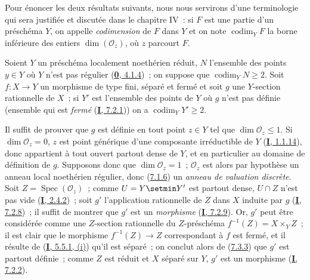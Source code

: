 \begin{env}[7.3.4]
\label{II.7.3.4-fr}
Pour énoncer les deux résultats suivants, nous nous servirons d'une
terminologie qui sera justifiée et discutée dans le chapitre IV~: si $F$ est
une partie
d'un préschéma $Y$, on appelle \emph{codimension} de $F$ dans $Y$ et on note
$\operatorname{codim}_YF$ la borne inférieure des entiers
$\dim(\mathcal{O}_z)$, où $z$ parcourt $F$.
\end{env}

\begin{corollary}[7.3.5]
\label{II.7.3.5-fr}
Soient $Y$ un préschéma localement noethérien réduit, $N$ l'ensemble des
points $y\in Y$ où $Y$ n'est pas régulier
\textup{(\hyperref[0.4.1.4-fr]{\textbf{0}, 4.1.4})}~; on suppose que
$\operatorname{codim}_YN\geq2$. Soit $f:X\to Y$ un morphisme de type fini,
\textup{séparé} et \textup{fermé} et soit $g$ une $Y$-section rationnelle de $X$~; si $Y'$ est
l'ensemble des points de $Y$ où $g$ n'est pas définie \textup{(ensemble qui est
\emph{fermé} (\hyperref[I.7.2.1-fr]{\textbf{I}, 7.2.1}))} on a
$\operatorname{codim}_YY'\geq2$.
\end{corollary}

Il suffit de prouver que $g$ est définie en tout point $z\in Y$ tel que
$\dim\mathcal{O}_z\leq1$. Si $\dim\mathcal{O}_z=0$, $z$ est point générique
d'une composante irréductible de $Y$ (\hyperref[I.1.1.14-fr]{\textbf{I}, 1.1.14}), donc
appartient à tout ouvert partout dense de $Y$, et en particulier au domaine de
définition de $g$. Supposons donc que $\dim\mathcal{O}_z=1$~;
$\mathcal{O}_z$ est alors par hypothèse un anneau local noethérien régulier,
donc (\hyperref[II.7.1.6-fr]{7.1.6}) un \emph{anneau de valuation discrète}.
Soit $Z=\operatorname{Spec}(\mathcal{O}_z)$~; comme $U=Y\setmin Y'$ est partout
dense, $U\cap Z$ n'est pas vide (\hyperref[I.2.4.2-fr]{\textbf{I}, 2.4.2})~; soit $g'$
l'application rationnelle de $Z$ dans $X$ induite par $g$
(\hyperref[I.7.2.8-fr]{\textbf{I}, 7.2.8})~; il suffit de montrer que $g'$ est un
\emph{morphisme} (\hyperref[I.7.2.9-fr]{\textbf{I}, 7.2.9}). Or, $g'$ peut être
considérée comme une $Z$-section rationnelle du $Z$-préschéma
$f^{-1}(Z)=X\times_YZ$~; il est clair que le morphisme $f^{-1}(Z)\to Z$
correspondant à $f$ est fermé, et il résulte de
(\hyperref[I.5.5.1-fr]{\textbf{I}, 5.5.1, (i)}) qu'il est séparé~; on conclut alors de
(\hyperref[II.7.3.3-fr]{7.3.3}) que $g'$ est partout définie~; comme $Z$ est
réduit et $X$ séparé sur $Y$, $g'$ est un morphisme
(\hyperref[I.7.2.2-fr]{\textbf{I}, 7.2.2}).

